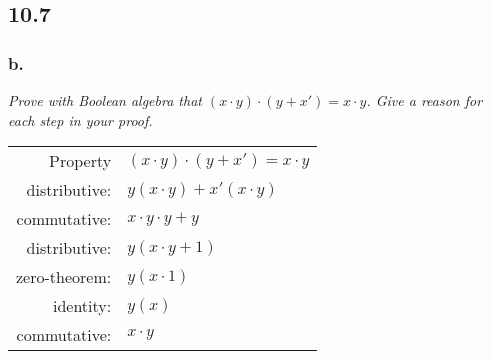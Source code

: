 \documentclass[a4paper,man,natbib]{apa6}
\begin{document}
\subsection{10.7}
\subsubsection{b.}
\emph{Prove with Boolean algebra that $ (𝑥 \cdot 𝑦) \cdot (𝑦+𝑥′) = 𝑥 \cdot 𝑦 $. Give a reason for each step in your proof.} \\
\begin{tabular}{r|l}
	Property & $ (x \cdot y) \cdot (y + x') = x \cdot y $ \\
	distributive: & $ y(x \cdot y) + x'(x \cdot y) $ \\
	commutative: & $ x \cdot y \cdot y + y $ \\
	distributive: & $ y(x \cdot y + 1) $ \\
	zero-theorem: & $ y(x \cdot 1) $ \\
	identity: & $ y(x) $ \\
	commutative: & $ x \cdot y $ 
\end{tabular} \\

\nocite{warford10}


\end{document}
